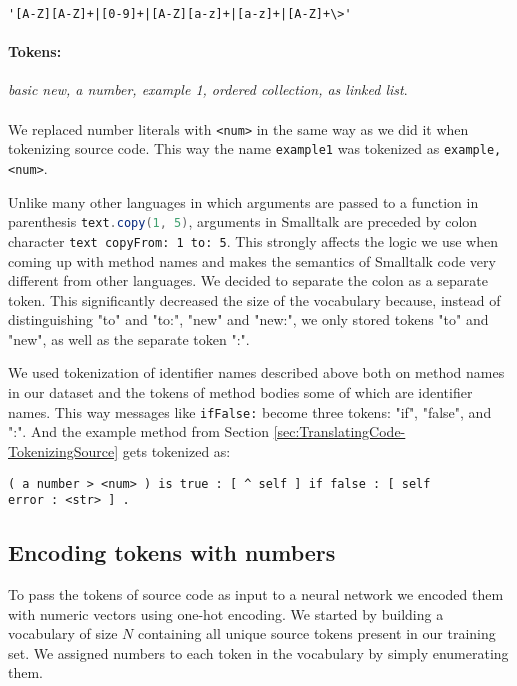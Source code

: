 \begin{center}
\begin{lstlisting}
'[A-Z][A-Z]+|[0-9]+|[A-Z][a-z]+|[a-z]+|[A-Z]+\>'
\end{lstlisting}
\end{center}

\paragraph{Tokens:} \textit{basic new, a number, example 1, ordered collection, as linked list}.

\paragraph{}We replaced number literals with \texttt{<num>} in the same way as we did it when tokenizing source code. This way the name \texttt{example1} was tokenized as \texttt{example, <num>}.

Unlike many other languages in which arguments are passed to a function in parenthesis \lstinline[language=Java]{text.copy(1, 5)}, arguments in Smalltalk are preceded by colon character \lstinline{text copyFrom: 1 to: 5}. This strongly affects the logic we use when coming up with method names and makes the semantics of Smalltalk code very different from other languages. We decided to separate the colon as a separate token. This significantly decreased the size of the vocabulary because, instead of distinguishing "to" and "to:", "new" and "new:", we only stored tokens "to" and "new", as well as the separate token ":".

We used tokenization of identifier names described above both on method names in our dataset and the tokens of method bodies some of which are identifier names. This way messages like \texttt{ifFalse:} become three tokens: "if", "false", and ":". And the example method from Section \ref{sec:TranslatingCode-TokenizingSource} gets tokenized as:

\begin{lstlisting}
( a number > <num> ) is true : [ ^ self ] if false : [ self
error : <str> ] .
\end{lstlisting}

\subsection{Encoding tokens with numbers}
\label{sec:TranslatingCode-EncodingTokens}

To pass the tokens of source code as input to a neural network we encoded them with numeric vectors using one-hot encoding. We started by building a vocabulary of size $N$ containing all unique source tokens present in our training set. We assigned numbers to each token in the vocabulary by simply enumerating them.

